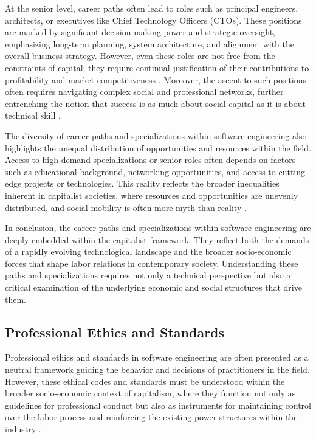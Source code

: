 \begin{refsection}
At the senior level, career paths often lead to roles such as principal engineers, architects, or executives like Chief Technology Officers (CTOs). These positions are marked by significant decision-making power and strategic oversight, emphasizing long-term planning, system architecture, and alignment with the overall business strategy. However, even these roles are not free from the constraints of capital; they require continual justification of their contributions to profitability and market competitiveness \cite[pp.~74-78]{marx2008capital}. Moreover, the ascent to such positions often requires navigating complex social and professional networks, further entrenching the notion that success is as much about social capital as it is about technical skill \cite[pp.~150-154]{engels1987condition}.

The diversity of career paths and specializations within software engineering also highlights the unequal distribution of opportunities and resources within the field. Access to high-demand specializations or senior roles often depends on factors such as educational background, networking opportunities, and access to cutting-edge projects or technologies. This reality reflects the broader inequalities inherent in capitalist societies, where resources and opportunities are unevenly distributed, and social mobility is often more myth than reality \cite[pp.~94-97]{braverman1974labor}.

In conclusion, the career paths and specializations within software engineering are deeply embedded within the capitalist framework. They reflect both the demands of a rapidly evolving technological landscape and the broader socio-economic forces that shape labor relations in contemporary society. Understanding these paths and specializations requires not only a technical perspective but also a critical examination of the underlying economic and social structures that drive them.

\subsection{Professional Ethics and Standards}

Professional ethics and standards in software engineering are often presented as a neutral framework guiding the behavior and decisions of practitioners in the field. However, these ethical codes and standards must be understood within the broader socio-economic context of capitalism, where they function not only as guidelines for professional conduct but also as instruments for maintaining control over the labor process and reinforcing the existing power structures within the industry \cite[pp.~150-153]{braverman1974labor}.


\end{refsection}
